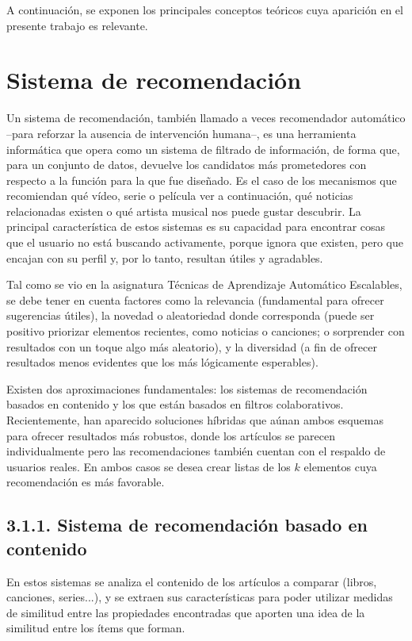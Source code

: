 
A continuación, se exponen los principales conceptos teóricos cuya aparición en el presente trabajo es relevante.

\section{Sistema de recomendación}

Un sistema de recomendación, también llamado a veces recomendador automático –para reforzar la ausencia de intervención humana–, es una herramienta informática que opera como un sistema de filtrado de información, de forma que, para un conjunto de datos, devuelve los candidatos más prometedores con respecto a la función para la que fue diseñado. Es el caso de los mecanismos que recomiendan qué vídeo, serie o película ver a continuación, qué noticias relacionadas existen o qué artista musical nos puede gustar descubrir. La principal característica de estos sistemas es su capacidad para encontrar cosas que el usuario no está buscando activamente, porque ignora que existen, pero que encajan con su perfil y, por lo tanto, resultan útiles y agradables.

Tal como se vio en la asignatura \guillemotleft Técnicas de Aprendizaje Automático Escalables\guillemotright, se debe tener en cuenta factores como la relevancia (fundamental para ofrecer sugerencias útiles), la novedad o aleatoriedad donde corresponda (puede ser positivo priorizar elementos recientes, como noticias o canciones; o sorprender con resultados con un toque algo más aleatorio), y la diversidad (a fin de ofrecer resultados menos evidentes que los más lógicamente esperables).

Existen dos aproximaciones fundamentales: los sistemas de recomendación basados en contenido y los que están basados en filtros colaborativos. Recientemente, han aparecido soluciones híbridas que aúnan ambos esquemas para ofrecer resultados más robustos, donde los artículos se parecen individualmente pero las recomendaciones también cuentan con el respaldo de usuarios reales. En ambos casos se desea crear listas de los $k$ elementos cuya recomendación es más favorable.

\subsection{3.1.1. Sistema de recomendación basado en contenido}

En estos sistemas se analiza el contenido de los artículos a comparar (libros, canciones, series...), y se extraen sus características para poder utilizar medidas de similitud entre las propiedades encontradas que aporten una idea de la similitud entre los ítems que forman.

